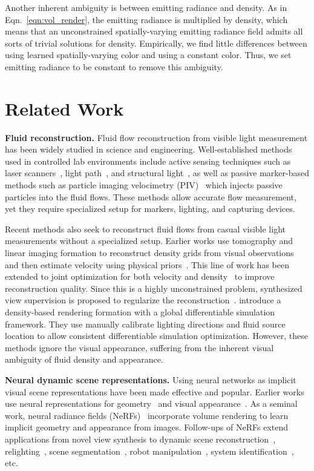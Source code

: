 \documentclass{article}
\newcommand{\eqn}[1]{Eqn.~\ref{#1}}
\newcommand{\myparagraph}[1]{\vspace{0.1cm}\noindent\textbf{#1}}
\begin{document}
Another inherent ambiguity is between emitting radiance and density. As in \eqn{eqn:vol_render}, the emitting radiance is multiplied by density, which means that an unconstrained spatially-varying emitting radiance field admits all sorts of trivial solutions for density. Empirically, we find little differences between using learned spatially-varying color and using a constant color. Thus, we set emitting radiance to be constant to remove this ambiguity.
 \section{Related Work}
\myparagraph{Fluid reconstruction.}
Fluid flow reconstruction from visible light measurement has been widely studied in science and engineering. Well-established methods used in controlled lab environments include active sensing techniques such as laser scanners~\citep{hawkins2005acquisition}, light path~\citep{ji2013reconstructing}, and structural light~\citep{gu2012compressive}, as well as passive marker-based methods such as particle imaging velocimetry (PIV)~\citep{adrian2011particle,elsinga2006tomographic} which injects passive particles into the fluid flows. These methods allow accurate flow measurement, yet they require specialized setup for markers, lighting, and capturing devices.

Recent methods also seek to reconstruct fluid flows from casual visible light measurements without a specialized setup. Earlier works use tomography and linear imaging formation to reconstruct density grids from visual observations~\citep{gregson2014capture,okabe2015fluid} and then estimate velocity using physical priors~\citep{gregson2014capture,eckert2018coupled}. This line of work has been extended to joint optimization for both velocity and density~\citep{eckert2019scalarflow} to improve reconstruction quality. Since this is a highly unconstrained problem, synthesized view supervision is proposed to regularize the reconstruction~\citep{zang2020tomofluid}. \citet{franz2021global} introduce a density-based rendering formation with a global differentiable simulation framework. They use manually calibrate lighting directions and fluid source location to allow consistent differentiable simulation optimization. However, these methods ignore the visual appearance, suffering from the inherent visual ambiguity of fluid density and appearance.

\myparagraph{Neural dynamic scene representations.} Using neural networks as implicit visual scene representations have been made effective and popular. Earlier works use neural representations for geometry~\citep{park2019deepsdf,mescheder2019occupancy} and visual appearance~\citep{sitzmann2019scene}. As a seminal work, neural radiance fields (NeRFs)~\citep{mildenhall2020nerf} incorporate volume rendering to learn implicit geometry and appearance from images. Follow-ups of NeRFs extend applications from novel view synthesis to dynamic scene reconstruction~\citep{li2021neural,pumarola2021d}, relighting~\citep{zhang2021physg,yu2023learning}, scene segmentation~\citep{yu2022unsupervised,sajjadi2022object}, robot manipulation~\citep{le2023differentiable,tian2023multi}, system identification~\citep{li2023pac}, etc. 
\end{document}
